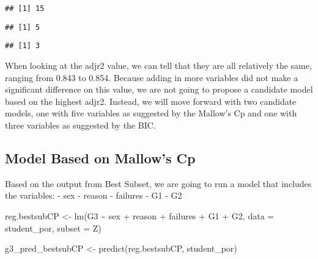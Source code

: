 \documentclass[
]{article}
\newenvironment{Shaded}{\begin{snugshade}}{\end{snugshade}}
\newcommand{\AttributeTok}[1]{\textcolor[rgb]{0.77,0.63,0.00}{#1}}
\newcommand{\DecValTok}[1]{\textcolor[rgb]{0.00,0.00,0.81}{#1}}
\newcommand{\FunctionTok}[1]{\textcolor[rgb]{0.00,0.00,0.00}{#1}}
\newcommand{\NormalTok}[1]{#1}
\newcommand{\OtherTok}[1]{\textcolor[rgb]{0.56,0.35,0.01}{#1}}
\newcommand{\SpecialCharTok}[1]{\textcolor[rgb]{0.00,0.00,0.00}{#1}}
\begin{document}
\begin{verbatim}
## [1] 15
\end{verbatim}

\begin{Shaded}
\end{Shaded}

\begin{verbatim}
## [1] 5
\end{verbatim}

\begin{Shaded}
\end{Shaded}

\begin{verbatim}
## [1] 3
\end{verbatim}

When looking at the adjr2 value, we can tell that they are all
relatively the same, ranging from 0.843 to 0.854. Because adding in more
variables did not make a significant difference on this value, we are
not going to propose a candidate model based on the highest adjr2.
Instead, we will move forward with two candidate models, one with five
variables as suggested by the Mallow's Cp and one with three variables
as suggested by the BIC.

\hypertarget{model-based-on-mallows-cp}{%
\subsection{Model Based on Mallow's
Cp}\label{model-based-on-mallows-cp}}

Based on the output from Best Subset, we are going to run a model that
includes the variables: - sex - reason - failures - G1 - G2

\begin{Shaded}
\begin{Highlighting}[]
\NormalTok{reg.bestsubCP }\OtherTok{\textless{}{-}} \FunctionTok{lm}\NormalTok{(G3 }\SpecialCharTok{\textasciitilde{}}\NormalTok{ sex }\SpecialCharTok{+}\NormalTok{ reason }\SpecialCharTok{+}\NormalTok{ failures }\SpecialCharTok{+}\NormalTok{ G1 }\SpecialCharTok{+}\NormalTok{ G2, }\AttributeTok{data =}\NormalTok{ student\_por, }\AttributeTok{subset =}\NormalTok{ Z)}

\NormalTok{g3\_pred\_bestsubCP }\OtherTok{\textless{}{-}} \FunctionTok{predict}\NormalTok{(reg.bestsubCP, student\_por)}
\end{Highlighting}
\end{Shaded}
\end{document}
